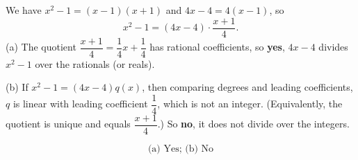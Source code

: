 We have $x^2-1=(x-1)(x+1)$ and $4x-4=4(x-1)$, so
\[
x^2-1=(4x-4)\cdot\dfrac{x+1}{4}.
\]
(a) The quotient $\dfrac{x+1}{4}=\dfrac{1}{4}x+\dfrac{1}{4}$ has rational coefficients, so \textbf{yes}, $4x-4$ divides $x^2-1$ over the rationals (or reals).

(b) If $x^2-1=(4x-4)q(x)$, then comparing degrees and leading coefficients, $q$ is linear with leading coefficient $\dfrac{1}{4}$, which is not an integer. (Equivalently, the quotient is unique and equals $\dfrac{x+1}{4}$.) So \textbf{no}, it does not divide over the integers.

\[
\boxed{\text{(a) Yes; (b) No}}
\]
